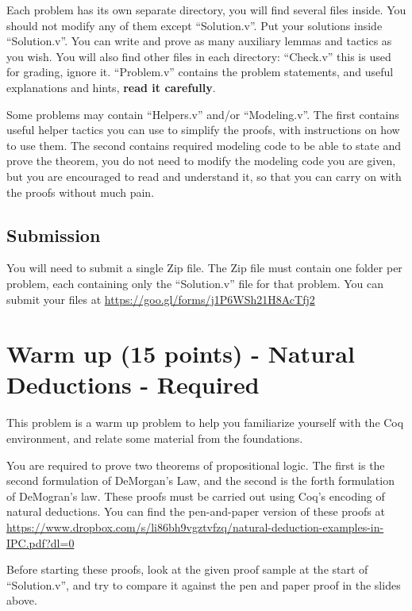 \documentclass{article}
\begin{document}
Each problem has its own separate directory, you will find several files inside. You should not modify any
of them except ``Solution.v''. Put your solutions inside ``Solution.v''. You can write and prove as many auxiliary
lemmas and tactics as you wish. You will also find other files in each directory: ``Check.v'' this is used for grading,
ignore it. ``Problem.v'' contains the problem statements, and useful explanations and hints, \textbf{read it carefully}.

Some problems may contain ``Helpers.v'' and/or ``Modeling.v''. The first contains useful helper tactics you can use to simplify
the proofs, with instructions on how to use them. The second contains required modeling code to be able to state and prove
the theorem, you do not need to modify the modeling code you are given, but you are encouraged to read and understand it, so
that you can carry on with the proofs without much pain.

\subsection*{Submission}
You will need to submit a single Zip file. The Zip file must contain one folder per problem, each containing only the ``Solution.v''
file for that problem. You can submit your files at \href{https://goo.gl/forms/j1P6WSh21H8AcTfj2}{https://goo.gl/forms/j1P6WSh21H8AcTfj2}

\section*{Warm up (15 points) - Natural Deductions - Required}
This problem is a warm up problem to help you familiarize yourself with the Coq environment, and relate some material from the foundations.

You are required to prove two theorems of propositional logic. The first is the second formulation of DeMorgan's Law, and the second is the forth formulation
of DeMogran's law. These proofs must be carried out using Coq's encoding of natural deductions. You can find the pen-and-paper version of these proofs at
\href{https://www.dropbox.com/s/li86bh9vgztvfzq/natural-deduction-examples-in-IPC.pdf?dl=0}{https://www.dropbox.com/s/li86bh9vgztvfzq/natural-deduction-examples-in-IPC.pdf?dl=0}

Before starting these proofs, look at the given proof sample at the start of ``Solution.v'', and try to compare it against the pen and paper proof in the slides above.
\end{document}
